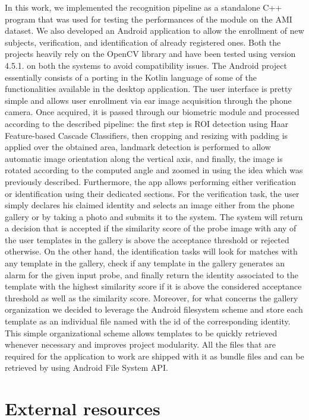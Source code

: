 \documentclass{article}
\begin{document}
In this work, we implemented the recognition pipeline as a standalone C++ program that was used for
testing the performances of the module on the AMI dataset. We also developed an Android application
to allow the enrollment of new subjects, verification, and identification of already registered ones.
Both the projects heavily rely on the OpenCV library \cite{opencv_library} and have been tested using
version 4.5.1. on both the systems to avoid compatibility issues. The Android project essentially consists
of a porting in the Kotlin language of some of the functionalities available in the desktop application.
The user interface is pretty simple and allows user enrollment via ear image acquisition through the phone
camera. Once acquired, it is passed through our biometric module and processed according to the described pipeline:
the first step is ROI detection using Haar Feature-based Cascade Classifiers, then cropping and resizing with
padding is applied over the obtained area, landmark detection is performed to allow automatic image orientation
along the vertical axis, and finally, the image is rotated according to the computed angle and zoomed in using
the idea which was previously described.
Furthermore, the app allows performing either verification or identification using their dedicated sections.
For the verification task, the user simply declares his claimed identity and selects an image either from the phone
gallery or by taking a photo and submits it to the system. The system will return a decision that is accepted if the
similarity score of the probe image with any of the user templates in the gallery is above the acceptance threshold
or rejected otherwise. On the other hand, the identification tasks will look for matches with any template in the
gallery, check if any template in the gallery generates an alarm for the given input probe, and finally return
the identity associated to the template with the highest similarity score if it is above the considered acceptance
threshold as well as the similarity score.
Moreover, for what concerns the gallery organization we decided to leverage the Android filesystem scheme and
store each template as an individual file named with the id of the corresponding identity. This simple organizational
scheme allows templates to be quickly retrieved whenever necessary and improves project modularity. All the files that
are required for the application to work are shipped with it as bundle files and can be retrieved by using
Android File System API. 

\section{External resources}
\end{document}
